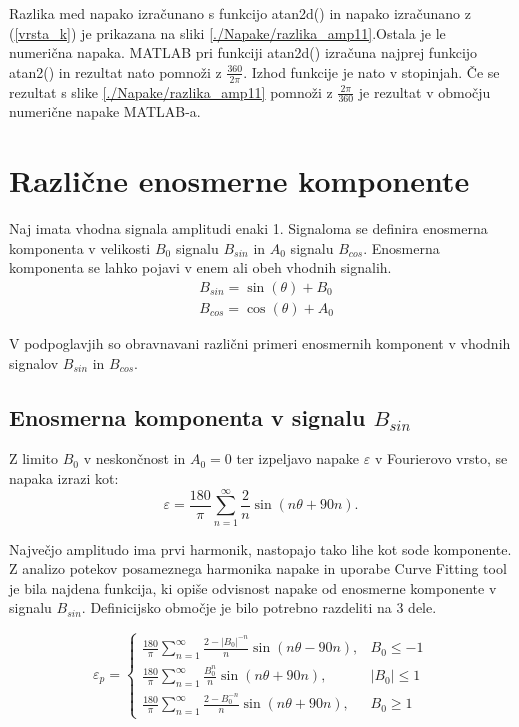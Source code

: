 Razlika med napako izračunano s funkcijo atan2d() in napako izračunano z (\ref{vrsta_k}) je prikazana na sliki \ref{./Napake/razlika_amp11}.Ostala je le numerična napaka. MATLAB pri funkciji atan2d() izračuna najprej funkcijo
atan2() in  rezultat nato pomnoži z $\frac{360}{2\pi}$. Izhod funkcije je nato v stopinjah. Če se rezultat s slike \ref{./Napake/razlika_amp11} pomnoži z $\frac{2\pi}{360}$ je rezultat v območju numerične napake MATLAB-a.
\newpage
\section{Različne enosmerne komponente}
Naj imata vhodna signala amplitudi enaki 1. Signaloma se definira enosmerna komponenta v velikosti $B_0$ signalu $B_{sin}$ in $A_0$ signalu $B_{cos}$. Enosmerna komponenta se lahko pojavi v enem ali obeh vhodnih signalih.
\begin{eqnarray}
\label{equ:def_sin_ama}
&B_{sin} = \sin(\theta) + B_0\\
\label{equ:def_cos_amp}
&B_{cos} =\cos(\theta) +A_0
\end{eqnarray}

V podpoglavjih so obravnavani različni primeri enosmernih komponent v vhodnih signalov $B_{sin}$ in $B_{cos}$.
\subsection{Enosmerna komponenta v signalu $B_{sin}$}

Z limito $B_0$ v neskončnost in $A_0 = 0$ ter izpeljavo napake $\varepsilon$ v Fourierovo vrsto, se napaka izrazi kot:
\begin{equation}
\varepsilon = \frac{180}{\pi}\sum_{n=1}^{\infty}\frac{2}{n} \sin (n \theta + 90 n).
\end{equation}

Največjo amplitudo ima prvi harmonik, nastopajo tako lihe kot sode komponente.
Z analizo potekov posameznega harmonika napake in uporabe Curve Fitting tool je bila najdena funkcija, ki opiše odvisnost napake od enosmerne komponente v signalu $B_{sin}$. Definicijsko območje je bilo potrebno
razdeliti na 3 dele.%

\begin{equation}
\label{vrsta_sinoff}
\varepsilon_p=
\begin{cases}
\frac{180}{\pi}\sum_{n=1}^{\infty}\frac{2-|B_0|^{-n}}{n} \sin (n \theta -  90 n), & B_0\leq -1 \\
\frac{180}{\pi}\sum_{n=1}^{\infty}\frac{B_0^n}{n} \sin (n \theta + 90 n), & |B_0|\leq 1 \\
\frac{180}{\pi}\sum_{n=1}^{\infty}\frac{2-B_0^{-n}}{n} \sin (n \theta + 90 n), & B_0\geq 1
\end{cases}
\end{equation}
\newpage
